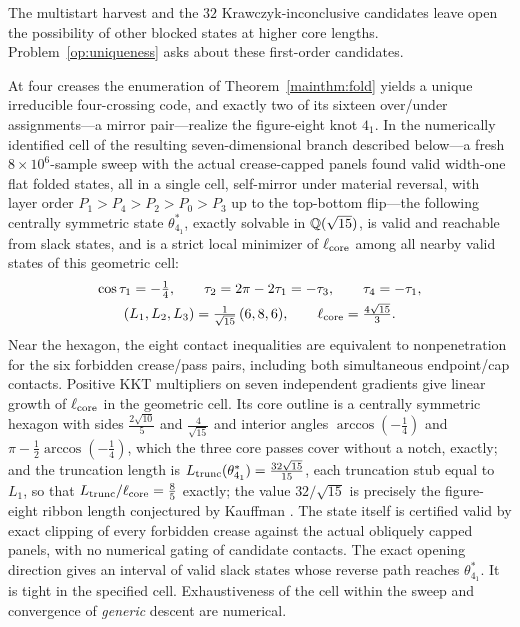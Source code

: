 \begin{compres}\label{compres:censusintro}
The multistart harvest and the $32$ Krawczyk-inconclusive candidates leave open the possibility of other blocked states at higher core lengths. Problem~\ref{op:uniqueness} asks about these first-order candidates.
\end{compres}

\begin{mainthm}\label{mainthm:hex}
At four creases the enumeration of Theorem~\textup{\ref{mainthm:fold}} yields a unique irreducible four-crossing code, and exactly two of its sixteen over/under assignments---a mirror pair---realize the figure-eight knot $4_1$. In the numerically identified cell of the resulting seven-dimensional branch described below---a fresh $8\times10^6$-sample sweep with the actual crease-capped panels found valid width-one flat folded states, all in a single cell, self-mirror under material reversal, with layer order $P_1>P_4>P_2>P_0>P_3$ up to the top-bottom flip---the following centrally symmetric state $\theta^*_{4_1}$, exactly solvable in $\mathbb{Q}(\sqrt{15})$, is valid and reachable from slack states, and is a strict local minimizer of $\ell_{\mathrm{core}}$ among all nearby valid states of this geometric cell:
\begin{gather*}
\cos\tau_1=-\tfrac14,\qquad \tau_2=2\pi-2\tau_1=-\tau_3,\qquad \tau_4=-\tau_1,\\
(L_1,L_2,L_3)=\tfrac{1}{\sqrt{15}}\,(6,8,6),\qquad \ell_{\mathrm{core}}=\tfrac{4\sqrt{15}}{3}.
\end{gather*}
Near the hexagon, the eight contact inequalities are equivalent to nonpenetration for the six forbidden crease/pass pairs, including both simultaneous endpoint/cap contacts. Positive KKT multipliers on seven independent gradients give linear growth of $\ell_{\mathrm{core}}$ in the geometric cell. Its core outline is a centrally symmetric hexagon with sides $\tfrac{2\sqrt{10}}5$ and $\tfrac{4}{\sqrt{15}}$ and interior angles $\arccos(-\tfrac14)$ and $\pi-\tfrac12\arccos(-\tfrac14)$, which the three core passes cover without a notch, exactly; and the truncation length is $L_{\mathrm{trunc}}(\theta^*_{4_1})=\tfrac{32\sqrt{15}}{15}$, each truncation stub equal to $L_1$, so that $L_{\mathrm{trunc}}/\ell_{\mathrm{core}}=\tfrac85$ exactly; the value $32/\sqrt{15}$ is precisely the figure-eight ribbon length conjectured by Kauffman \cite{kauffman2004}. The state itself is certified valid by exact clipping of every forbidden crease against the actual obliquely capped panels, with no numerical gating of candidate contacts. The exact opening direction gives an interval of valid slack states whose reverse path reaches $\theta^*_{4_1}$. It is tight in the specified cell. Exhaustiveness of the cell within the sweep and convergence of \emph{generic} descent are numerical.
\end{mainthm}
